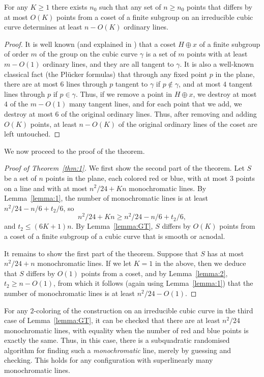 \documentclass[a4paper,11pt,leqno]{article}
\begin{document}
\begin{lemma}\label{lemma:2}
For any $K \geq 1$ there exists $n_0$ such that any set of $n\geq n_0$ points that differs by at most $O(K)$ points from a coset of a finite subgroup on an irreducible cubic curve determines at least $n-O(K)$ ordinary lines.
\end{lemma}
\begin{proof}
It is well known (and explained in \cite{greentao2013}) that a coset $H\oplus x$ of a finite subgroup of order $m$ of the group on the cubic curve $\gamma$ is a set of $m$ points with at least $m-O(1)$ ordinary lines, and they are all tangent to $\gamma$.
It is also a well-known classical fact (the Pl\"ucker formulas) that through any fixed point $p$ in the plane, there are at most $6$ lines through $p$ tangent to $\gamma$ if $p\notin\gamma$, and at most $4$ tangent lines through $p$ if $p\in\gamma$.
Thus, if we remove a point in $H\oplus x$, we destroy at most $4$ of the $m-O(1)$ many tangent lines, and for each point that we add, we destroy at most $6$ of the original ordinary lines.
Thus, after removing and adding $O(K)$ points, at least $n-O(K)$ of the original ordinary lines of the coset are left untouched.
\end{proof}

We now proceed to the proof of the theorem.

\begin{proof}[Proof of Theorem~\ref{thm:1}]
We first show the second part of the theorem.
Let $S$ be a set of $n$ points in the plane, each colored red or blue, with at most $3$ points on a line and with at most $n^2/24+Kn$ monochromatic lines.
By Lemma~\ref{lemma:1}, the number of monochromatic lines is at least $n^2/24 -n/6 + t_2/6$, so \[n^2/24 + Kn \geq n^2/24 -n/6 + t_2/6,\] 
and $t_2 \leq (6K+1)n$.
By Lemma~\ref{lemma:GT}, $S$ differs by $O(K)$ points from a coset of a finite subgroup of a cubic curve that is smooth or acnodal.

It remains to show the first part of the theorem.
Suppose that $S$ has at most $n^2/24+n$ monochromatic lines.
If we let $K=1$ in the above, then we deduce that $S$ differs by $O(1)$ points from a coset, and by Lemma~\ref{lemma:2}, $t_2\geq n - O(1)$,
from which it follows (again using Lemma~\ref{lemma:1}) that the number of monochromatic lines is at least $n^2/24-O(1)$.
\end{proof}






For any $2$-coloring of the construction on an irreducible cubic curve in the third case of Lemma~\ref{lemma:GT}, it can be checked that there are at least $n^2/24$ monochromatic lines, with equality when the number of red and blue points is  exactly the same.
Thus, in this case, there is a subquadratic randomised algorithm for finding such a \emph{monochromatic} line, merely by guessing and checking.
This holds for any configuration with superlinearly many monochromatic lines.
\end{document}
